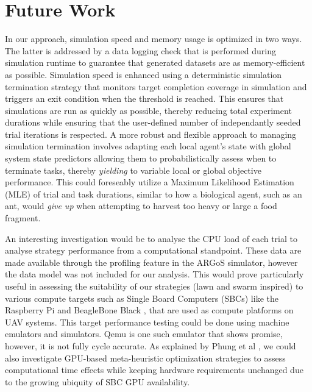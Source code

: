 \documentclass{report}
\begin{document}
\section{Future Work}
In our approach, simulation speed and memory usage is optimized in two ways. The latter is addressed by a data logging check that is performed during simulation runtime to guarantee that generated datasets are as memory-efficient as possible. Simulation speed is enhanced using a deterministic simulation termination strategy that monitors target completion coverage in simulation and triggers an exit condition when the threshold is reached. This ensures that simulations are run as quickly as possible, thereby reducing total experiment durations while ensuring that the user-defined number of independantly seeded trial iterations is respected. A more robust and flexible approach to managing simulation termination involves adapting each local agent's state with global system state predictors allowing them to probabilistically assess when to terminate tasks, thereby \textit{yielding} to variable local or global objective performance. This could foreseably utilize a Maximum Likelihood Estimation (MLE) of trial and task durations, similar to how a biological agent, such as an ant, would \textit{give up} when attempting to harvest too heavy or large a food fragment.

An interesting investigation would be to analyse the CPU load of each trial to analyse strategy performance from a computational standpoint. These data are made available through the profiling feature in the ARGoS simulator, however the data model was not included for our analysis. This would prove particularly useful in assessing the suitability of our strategies (lawn and swarm inspired) to various compute targets such as Single Board Computers (SBCs) like the Raspberry Pi \cite{Gay2014} and BeagleBone Black \cite{Kridner}, that are used as compute platforms on UAV systems. This target performance testing could be done using machine emulators and simulators. Qemu \cite{Bellard2005} is one such emulator that shows promise, however, it is not fully cycle accurate. As explained by Phung et al \cite{Phung2017}, we could also investigate GPU-based meta-heuristic optimization strategies to assess computational time effects while keeping hardware requirements unchanged due to the growing ubiquity of SBC GPU availability.
\end{document}
